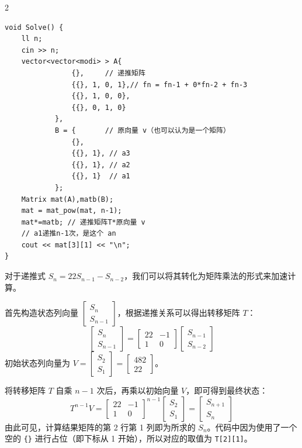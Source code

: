 \begin{multicols*}{2}
		\begin{verbatim}
void Solve() {
	ll n;
	cin >> n;
	vector<vector<modi> > A{
				{},     // 递推矩阵
				{{}, 1, 0, 1},// fn = fn-1 + 0*fn-2 + fn-3
				{{}, 1, 0, 0},
				{{}, 0, 1, 0}
			},
			B = {       // 原向量 v（也可以认为是一个矩阵）
				{},
				{{}, 1}, // a3
				{{}, 1}, // a2
				{{}, 1}  // a1
			};
	Matrix mat(A),matb(B);
	mat = mat_pow(mat, n-1);
	mat*=matb; // 递推矩阵T*原向量 v
	// a1递推n-1次，是这个 an
	cout << mat[3][1] << "\n";
}
		\end{verbatim}

		对于递推式 $S_{n}=22S_{n-1}-S_{n-2}$，我们可以将其转化为矩阵乘法的形式来加速计算。

		首先构造状态列向量 $\begin{bmatrix}
								S_n \\ S_{n-1}
		\end{bmatrix}$，根据递推关系可以得出转移矩阵 $T$：
		\[
			\begin{bmatrix}
				S_n \\ S_{n-1}
			\end{bmatrix} = \begin{bmatrix}
								22 & -1 \\ 1 & 0
			\end{bmatrix} \begin{bmatrix}
							  S_{n-1} \\ S_{n-2}
			\end{bmatrix}
		\]
		初始状态列向量为 $V = \begin{bmatrix}
								  S_2 \\ S_1
		\end{bmatrix} = \begin{bmatrix}
							482 \\ 22
		\end{bmatrix}$。

		将转移矩阵 $T$ 自乘 $n-1$ 次后，再乘以初始向量 $V$，即可得到最终状态：
		\[
			T^{n-1} V = \begin{bmatrix}
							22 & -1 \\ 1 & 0
			\end{bmatrix}^{n-1} \begin{bmatrix}
									S_2 \\ S_1
			\end{bmatrix} = \begin{bmatrix}
								S_{n+1} \\ S_n
			\end{bmatrix}
		\]
		由此可见，计算结果矩阵的第 2 行第 1 列即为所求的 $S_n$。代码中因为使用了一个空的 \verb|{}| 进行占位（即下标从 1 开始），所以对应的取值为 \verb|T[2][1]|。



\end{multicols*}
